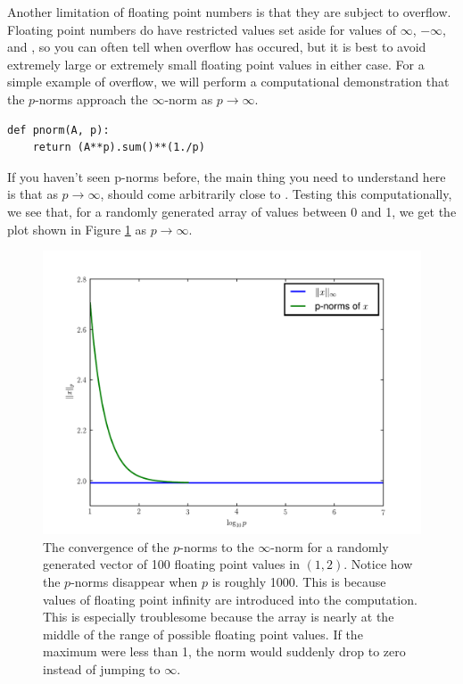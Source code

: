 Another limitation of floating point numbers is that they are subject to overflow.
Floating point numbers do have restricted values set aside for values of $\infty$, $-\infty$, and , so you can often tell when overflow has occured, but it is best to avoid extremely large or extremely small floating point values in either case.
For a simple example of overflow, we will perform a computational demonstration that the $p$-norms approach the $\infty$-norm as $p \rightarrow \infty$.
\begin{lstlisting}
def pnorm(A, p):
    return (A**p).sum()**(1./p)
\end{lstlisting}
If you haven't seen p-norms before, the main thing you need to understand here is that as $p \rightarrow \infty$,  should come arbitrarily close to .
Testing this computationally, we see that, for a randomly generated array of values between 0 and 1, we get the plot shown in Figure \ref{pnorm_convergence} as $p \rightarrow \infty$.

\begin{figure}
\includegraphics[width=\textwidth]{pnorm_convergence.pdf}
\caption{The convergence of the $p$-norms to the $\infty$-norm for a randomly generated vector of 100 floating point values in $(1,2)$.
Notice how the $p$-norms disappear when $p$ is roughly 1000.
This is because values of floating point infinity are introduced into the computation.
This is especially troublesome because the array is nearly at the middle of the range of possible floating point values.
If the maximum were less than 1, the norm would suddenly drop to zero instead of jumping to $\infty$.}
\label{pnorm_convergence}
\end{figure}


